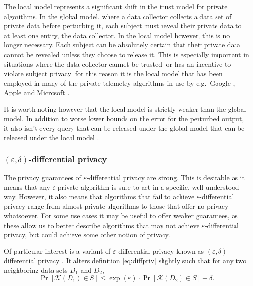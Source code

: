 \documentclass[a4paper,12pt]{article}
\newcommand{\fancy}{\mathcal}
\renewcommand{\epsilon}{\varepsilon}
\begin{document}
The local model represents a significant shift in the trust model for private algorithms. In the global model, where a data collector collects a data set of private data before perturbing it, each subject must reveal their private data to at least one entity, the data collector. In the local model however, this is no longer necessary. Each subject can be absolutely certain that their private data cannot be revealed unless they choose to release it. This is especially important in situations where the data collector cannot be trusted, or has an incentive to violate subject privacy; for this reason it is the local model that has been employed in many of the private telemetry algorithms in use by e.g.\ Google \cite{google_rappor}, Apple \cite{apple_differential} and Microsoft \cite{microsoft_telemetry}.

It is worth noting however that the local model is strictly weaker than the global model. In addition to worse lower bounds on the error for the perturbed output, it also isn't every query that can be released under the global model that can be released under the local model \cite[sec.~12.1]{dwork_privacybook}.

\subsubsection{$(\epsilon, \delta)$-differential privacy \label{sec:variant_eps_delta}}

The privacy guarantees of $\epsilon$-differential privacy are strong. This is desirable as it means that any $\epsilon$-private algorithm is sure to act in a specific, well understood way. However, it also means that algorithms that fail to achieve $\epsilon$-differential privacy range from almost-private algorithms to those that offer no privacy whatsoever. For some use cases it may be useful to offer weaker guarantees, as these allow us to better describe algorithms that may not achieve $\epsilon$-differential privacy, but could achieve some other notion of privacy.

Of particular interest is a variant of $\epsilon$-differential privacy known as $(\epsilon, \delta)$-differential privacy \cite{dwork2006_delta_diffpriv}. It alters definition \ref{eq:diffpriv} slightly such that for any two neighboring data sets $D_1$ and $D_2$,
\begin{equation*}
    \Pr[\fancy{K}(D_1) \in S] \leq \exp(\epsilon) \cdot \Pr[\fancy{K}(D_2) \in S] + \delta.
\end{equation*}
\end{document}
